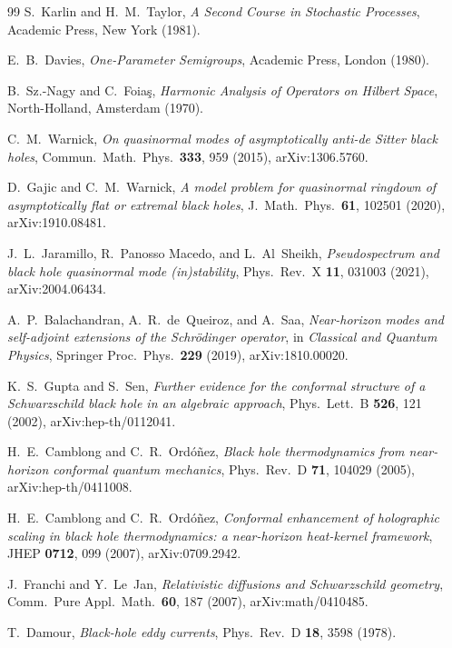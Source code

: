 \documentclass[11pt]{article}
\theoremstyle{definition}
\theoremstyle{remark}
\begin{document}
\begin{thebibliography}{99}
S.~Karlin and H.~M.~Taylor,
\emph{A Second Course in Stochastic Processes},
Academic Press, New York (1981).

E.~B.~Davies,
\emph{One-Parameter Semigroups},
Academic Press, London (1980).

B.~Sz.-Nagy and C.~Foia\c{s},
\emph{Harmonic Analysis of Operators on Hilbert Space},
North-Holland, Amsterdam (1970).

C.~M.~Warnick,
\emph{On quasinormal modes of asymptotically anti-de Sitter black
holes},
Commun.\ Math.\ Phys.\ \textbf{333}, 959 (2015), arXiv:1306.5760.

D.~Gajic and C.~M.~Warnick,
\emph{A model problem for quasinormal ringdown of asymptotically flat
or extremal black holes},
J.\ Math.\ Phys.\ \textbf{61}, 102501 (2020), arXiv:1910.08481.

J.~L.~Jaramillo, R.~Panosso Macedo, and L.~Al~Sheikh,
\emph{Pseudospectrum and black hole quasinormal mode (in)stability},
Phys.\ Rev.\ X \textbf{11}, 031003 (2021), arXiv:2004.06434.

A.~P.~Balachandran, A.~R.~de~Queiroz, and A.~Saa,
\emph{Near-horizon modes and self-adjoint extensions of the
Schr\"odinger operator},
in \emph{Classical and Quantum Physics}, Springer Proc.\ Phys.\
\textbf{229} (2019), arXiv:1810.00020.

K.~S.~Gupta and S.~Sen,
\emph{Further evidence for the conformal structure of a Schwarzschild
black hole in an algebraic approach},
Phys.\ Lett.\ B \textbf{526}, 121 (2002), arXiv:hep-th/0112041.

H.~E.~Camblong and C.~R.~Ord\'o\~nez,
\emph{Black hole thermodynamics from near-horizon conformal quantum
mechanics},
Phys.\ Rev.\ D \textbf{71}, 104029 (2005), arXiv:hep-th/0411008.

H.~E.~Camblong and C.~R.~Ord\'o\~nez,
\emph{Conformal enhancement of holographic scaling in black hole
thermodynamics: a near-horizon heat-kernel framework},
JHEP \textbf{0712}, 099 (2007), arXiv:0709.2942.

J.~Franchi and Y.~Le~Jan,
\emph{Relativistic diffusions and Schwarzschild geometry},
Comm.\ Pure Appl.\ Math.\ \textbf{60}, 187 (2007),
arXiv:math/0410485.

T.~Damour,
\emph{Black-hole eddy currents},
Phys.\ Rev.\ D \textbf{18}, 3598 (1978).


\end{thebibliography}
\end{document}

